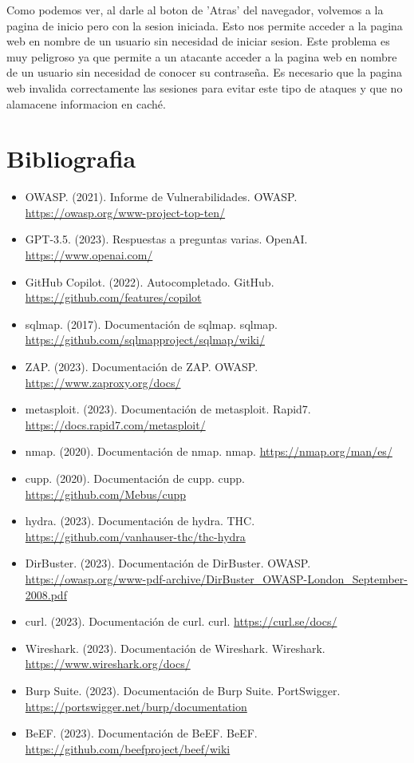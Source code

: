 \documentclass{report}
\begin{document}
                Como podemos ver, al darle al boton de 'Atras' del navegador, volvemos a la pagina de inicio pero con la sesion iniciada.
                Esto nos permite acceder a la pagina web en nombre de un usuario sin necesidad de iniciar sesion.
                Este problema es muy peligroso ya que permite a un atacante acceder a la pagina web en nombre de un usuario sin necesidad de conocer su contraseña.
                Es necesario que la pagina web invalida correctamente las sesiones para evitar este tipo de ataques y que no alamacene informacion en caché.
            \clearpage
    \chapter{Bibliografia}
        \begin{itemize}
            \item OWASP. (2021). Informe de Vulnerabilidades. OWASP. \url{https://owasp.org/www-project-top-ten/}
            \item GPT-3.5. (2023). Respuestas a preguntas varias. OpenAI. \url{https://www.openai.com/}
            \item GitHub Copilot. (2022). Autocompletado. GitHub. \url{https://github.com/features/copilot}
            \item sqlmap. (2017). Documentación de sqlmap. sqlmap. \url{https://github.com/sqlmapproject/sqlmap/wiki/}
            \item ZAP. (2023). Documentación de ZAP. OWASP. \url{https://www.zaproxy.org/docs/}
            \item metasploit. (2023). Documentación de metasploit. Rapid7. \url{https://docs.rapid7.com/metasploit/}
            \item nmap. (2020). Documentación de nmap. nmap. \url{https://nmap.org/man/es/}
            \item cupp. (2020). Documentación de cupp. cupp. \url{https://github.com/Mebus/cupp}
            \item hydra. (2023). Documentación de hydra. THC. \url{https://github.com/vanhauser-thc/thc-hydra}
            \item DirBuster. (2023). Documentación de DirBuster. OWASP. \url{https://owasp.org/www-pdf-archive/DirBuster_OWASP-London_September-2008.pdf}
            \item curl. (2023). Documentación de curl. curl. \url{https://curl.se/docs/}
            \item Wireshark. (2023). Documentación de Wireshark. Wireshark. \url{https://www.wireshark.org/docs/}
            \item Burp Suite. (2023). Documentación de Burp Suite. PortSwigger. \url{https://portswigger.net/burp/documentation}
            \item BeEF. (2023). Documentación de BeEF. BeEF. \url{https://github.com/beefproject/beef/wiki}
        \end{itemize}
\end{document}
